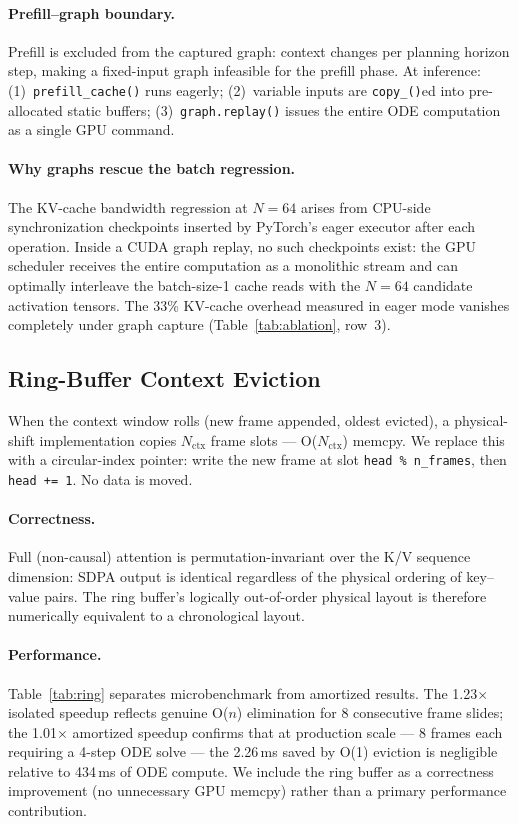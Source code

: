 \documentclass[letterpaper,twocolumn,10pt]{article}
\begin{document}
\paragraph{Prefill--graph boundary.}
Prefill is excluded from the captured graph: context changes per
planning horizon step, making a fixed-input graph infeasible for the
prefill phase.  At inference: (1)~\texttt{prefill\_cache()} runs
eagerly; (2)~variable inputs are \texttt{copy\_()}ed into
pre-allocated static buffers; (3)~\texttt{graph.replay()} issues the
entire ODE computation as a single GPU command.

\paragraph{Why graphs rescue the batch regression.}
The KV-cache bandwidth regression at $N{=}64$ arises from CPU-side
synchronization checkpoints inserted by PyTorch's eager executor
after each operation.  Inside a CUDA graph replay, no such checkpoints
exist: the GPU scheduler receives the entire computation as a monolithic
stream and can optimally interleave the batch-size-1 cache reads with
the $N{=}64$ candidate activation tensors.  The 33\% KV-cache overhead
measured in eager mode vanishes completely under graph capture
(Table~\ref{tab:ablation}, row~3).

\subsection{Ring-Buffer Context Eviction}
\label{sec:ring}

When the context window rolls (new frame appended, oldest evicted),
a physical-shift implementation copies $N_\text{ctx}$ frame slots ---
O($N_\text{ctx}$) memcpy.  We replace this with a circular-index
pointer: write the new frame at slot \texttt{head~\%~n\_frames}, then
\texttt{head += 1}.  No data is moved.

\paragraph{Correctness.}
Full (non-causal) attention is permutation-invariant over the K/V
sequence dimension: SDPA output is identical regardless of the physical
ordering of key--value pairs.  The ring buffer's logically
out-of-order physical layout is therefore numerically equivalent to
a chronological layout.

\paragraph{Performance.}
Table~\ref{tab:ring} separates microbenchmark from amortized results.
The 1.23$\times$ isolated speedup reflects genuine O($n$) elimination
for 8 consecutive frame slides; the 1.01$\times$ amortized speedup
confirms that at production scale --- 8 frames each requiring a 4-step
ODE solve --- the 2.26\,ms saved by O(1) eviction is negligible
relative to 434\,ms of ODE compute.  We include the ring buffer as a
correctness improvement (no unnecessary GPU memcpy) rather than a
primary performance contribution.
\end{document}
